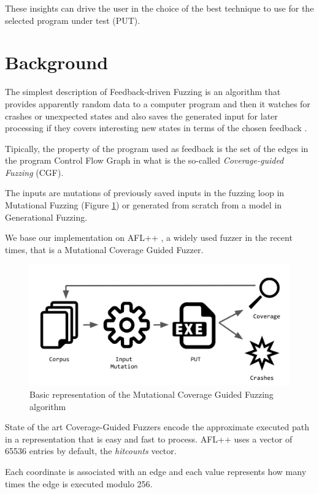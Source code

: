 \documentclass[conference,compsoc]{IEEEtran}
\begin{document}
These insights can drive the user in the choice of the best technique to use for the selected program under test (PUT).

\section{Background}

The simplest description of Feedback-driven Fuzzing is an algorithm that provides apparently random data to a computer program and then it watches for crashes or unexpected states and also saves the generated input for later processing if they covers interesting new states in terms of the chosen feedback \cite{fuzzing-book}.

Tipically, the property of the program used as feedback is the set of the edges in the program Control Flow Graph \cite{compilerbook} in what is the so-called {\it Coverage-guided Fuzzing} (CGF).

The inputs are mutations of previously saved inputs in the fuzzing loop in Mutational Fuzzing (Figure \ref{fig:cfg}) or generated from scratch from a model in Generational Fuzzing.

We base our implementation on {\sc AFL++} \cite{aflplusplus}, a widely used fuzzer in the recent times, that is a Mutational Coverage Guided Fuzzer.

\begin{figure}
\includegraphics[scale=0.2]{cgf}
\centering
\caption{Basic representation of the Mutational Coverage Guided Fuzzing algorithm}
\label{fig:cfg}
\end{figure}

State of the art Coverage-Guided Fuzzers encode the approximate executed path in a representation that is easy and fast to process.
{\sc AFL++} uses a vector of 65536 entries by default, the {\it hitcounts} vector.

Each coordinate is associated with an edge and each value represents how many times the edge is executed modulo 256.
\end{document}
